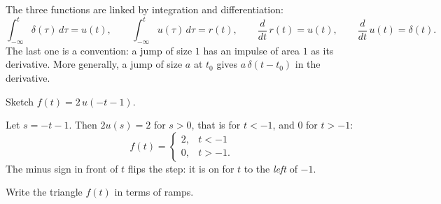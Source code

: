 \documentclass[11pt,a4paper]{article}
\newif\ifsolfirst
\newcommand{\solution}{\par\smallskip\noindent{\color{cpow}\bfseries Solution}\par\nobreak\smallskip\global\solfirsttrue}
\newcommand{\tax}[6]{\draw[vax] (#1,0) -- (#2,0) node[right, font=\small] {#5};
  \draw[vax] (0,#3) -- (0,#4) node[above, font=\small] {#6};}
\newcommand{\xt}[2]{\draw ([yshift=2pt]#1,0) -- ([yshift=-2pt]#1,0) node[below, font=\scriptsize] {#2};}
\newcommand{\yt}[2]{\draw ([xshift=2pt]0,#1) -- ([xshift=-2pt]0,#1) node[left, font=\scriptsize] {#2};}
\begin{document}
The three functions are linked by integration and differentiation:
\[
  \int_{-\infty}^{t} \delta(\tau)\,d\tau = u(t),
  \qquad
  \int_{-\infty}^{t} u(\tau)\,d\tau = r(t),
  \qquad
  \frac{d}{dt}\,r(t) = u(t),
  \qquad
  \frac{d}{dt}\,u(t) = \delta(t) .
\]
The last one is a convention: a jump of size $1$ has an impulse of area $1$ as its derivative.
More generally, a jump of size $a$ at $t_0$ gives $a\,\delta(t - t_0)$ in the derivative.

\begin{examplebox}
Sketch $f(t) = 2\,u(-t - 1)$.
\end{examplebox}

\solution

\begin{minipage}[c]{0.56\linewidth}
Let $s = -t - 1$. Then $2u(s) = 2$ for $s > 0$, that is for $t < -1$, and $0$ for $t > -1$:
\[
  f(t) = \begin{cases} 2, & t < -1\\ 0, & t > -1 . \end{cases}
\]
The minus sign in front of $t$ flips the step: it is on for $t$ to the \emph{left} of $-1$.
\end{minipage}\hfill
\begin{minipage}[c]{0.4\linewidth}
\centering
{}
\end{minipage}

\begin{examplebox}
\begin{minipage}[c]{0.4\linewidth}
\centering
{}
\end{minipage}\hfill
\begin{minipage}[c]{0.56\linewidth}
Write the triangle $f(t)$ in terms of ramps.
\end{minipage}
\end{examplebox}

\solution
\end{document}
